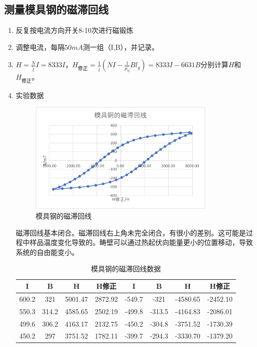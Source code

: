 \documentclass[11pt]{article}
\begin{document}
\subsection{测量模具钢的磁滞回线}
\begin{enumerate}
    \item 反复按电流方向开关8-10次进行磁锻炼
    \item 调整电流，每隔$50mA$测一组（I,B），并记录。
    \item $H=\frac{N}{\tilde{l}}I=8333I$，$H_{\text{修正}}=\frac{1}{\tilde{l}} \left(NI-\frac{1}{\mu_0}Bl_g\right)=8333I-6631B$分别计算$H$和$H_{\text{修正}}$。
    \item 实验数据
    \begin{figure}[H]
        \centering
        \includegraphics[width=9cm]{Fig/10.png}
        \caption{模具钢的磁滞回线}
    \end{figure}
    \hspace*{2em}磁滞回线基本闭合。磁滞回线右上角未完全闭合，有很小的差别。这可能是过程中样品温度变化导致的。畴壁可以通过热起伏向能量更小的位置移动，导致系统的自由能变小。
        \begin{table}[H]
          \centering
          \caption{模具钢的磁滞回线数据}
            \begin{tabular}{|c|c|c|c|c|c|c|c|}\hline
            I      & B      & H      & H修正    & I      & B      & H      & H修正 \\\hline
            600.2  & 321    & 5001.47  & 2872.92  & -549.7 & -321   & -4580.65  & -2452.10  \\\hline
            550.3  & 314.2  & 4585.65  & 2502.19  & -499.8 & -313.5 & -4164.83  & -2086.01  \\\hline
            499.6  & 306.2  & 4163.17  & 2132.75  & -450.2 & -304.8 & -3751.52  & -1730.39  \\\hline
            450.2  & 297    & 3751.52  & 1782.11  & -399.7 & -294.3 & -3330.70  & -1379.20  \\\hline

\end{tabular}
\end{table}
\end{enumerate}
\end{document}

